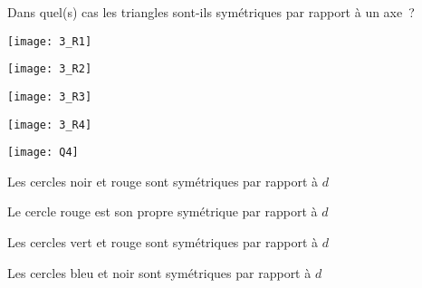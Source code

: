 \begin{QCM}
\begin{GroupeQCM}
    
    \begin{exercice}
      Dans quel(s) cas les triangles sont-ils symétriques par rapport à un axe ?
      \begin{ChoixQCM}{4}
      \item 
      
      \texttt{[image: 3\_R1]}
      \item 
      
      \texttt{[image: 3\_R2]}
      \item 
      
      \texttt{[image: 3\_R3]}
      \item 
      
      \texttt{[image: 3\_R4]}
      \end{ChoixQCM}
\begin{corrige}
   \end{corrige}
    \end{exercice}
    
    
    \begin{exercice}
      \begin{center} \texttt{[image: Q4]} \end{center}
      \begin{ChoixQCM}{4}
      \item Les cercles noir et rouge sont symétriques par rapport à $d$
      \item Le cercle rouge est son propre symétrique par rapport à $d$
      \item Les cercles vert et rouge sont symétriques par rapport à $d$
      \item Les cercles bleu et noir sont symétriques par rapport à $d$
      \end{ChoixQCM}
\begin{corrige}
   \end{corrige}
    \end{exercice}
    \end{GroupeQCM}
\end{QCM}
    
